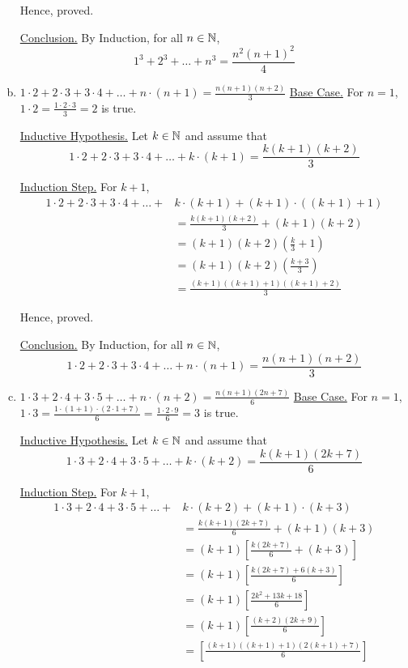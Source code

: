 \begin{enumerate}[(a).]
		Hence, proved.
		
		\underline{Conclusion.} By Induction, for all $n \in \mathbb{N}$,
		$$1^3 + 2^3 + \ldots + n^3 = \frac{n^2 (n+1)^2}{4}$$
		\es


	\item $\displaystyle 1 \cdot 2 + 2 \cdot 3 + 3 \cdot 4 + \ldots + n \cdot (n+1) = \frac{n(n+1)(n+2)}{3}$
		\bs
		\underline{Base Case.} For $n = 1$, $1 \cdot 2 = \frac{1 \cdot 2 \cdot 3}{3} = 2$ is true.

		\underline{Inductive Hypothesis.} Let $k \in \mathbb{N}$ and assume that 
		$$1 \cdot 2 + 2 \cdot 3 + 3 \cdot 4 + \ldots + k \cdot (k+1) = \frac{k(k+1)(k+2)}{3}$$

		\underline{Induction Step.} For $k+1$,
		\begin{align*}
			1 \cdot 2 + 2 \cdot 3 + 3 \cdot 4 + \ldots + &k \cdot (k+1) + (k+1) \cdot ((k+1)+1) \\
			&= \frac{k(k+1)(k+2)}{3} + (k+1)(k+2) \\
			&= (k+1)(k+2) \left( \frac{k}{3} + 1 \right) \\
			&= (k+1)(k+2) \left( \frac{k+3}{3} \right) \\
			&= \frac{(k+1)((k+1)+1)((k+1)+2)}{3}
		\end{align*}

		Hence, proved.

		\underline{Conclusion.} By Induction, for all $n \in \mathbb{N}$,
		$$1 \cdot 2 + 2 \cdot 3 + 3 \cdot 4 + \ldots + n \cdot (n+1) = \frac{n(n+1)(n+2)}{3}$$
		\es
		
	\item $\displaystyle 1 \cdot 3 + 2 \cdot 4 + 3 \cdot 5 + \ldots + n \cdot (n+2) = \frac{n(n+1)(2n+7)}{6}$
		\bs
		\underline{Base Case.} For $n = 1$, $1 \cdot 3 = \frac{1 \cdot (1+1) \cdot (2 \cdot 1 + 7)}{6} = \frac{1 \cdot 2 \cdot 9}{6} = 3$ is true.

		\underline{Inductive Hypothesis.} Let $k \in \mathbb{N}$ and assume that 
		$$1 \cdot 3 + 2 \cdot 4 + 3 \cdot 5 + \ldots + k \cdot (k+2) = \frac{k(k+1)(2k+7)}{6}$$

		\underline{Induction Step.} For $k+1$,
		\begin{align*}
			1 \cdot 3 + 2 \cdot 4 + 3 \cdot 5 + \ldots + &k \cdot (k+2) + (k+1) \cdot (k+3) \\
				&= \frac{k(k+1)(2k+7)}{6} + (k+1)(k+3) \\
				&= (k+1) \left[ \frac{k(2k+7)}{6} + (k+3) \right] \\
				&= (k+1) \left[ \frac{k(2k+7) + 6(k+3)}{6} \right] \\
				&= (k+1) \left[ \frac{2k^2 + 13k + 18}{6} \right] \\
				&= (k+1) \left[ \frac{(k+2)(2k+9)}{6} \right] \\
				&= \left[ \frac{(k+1)((k+1)+1)(2(k+1)+7)}{6} \right]
		\end{align*}


\end{enumerate}
